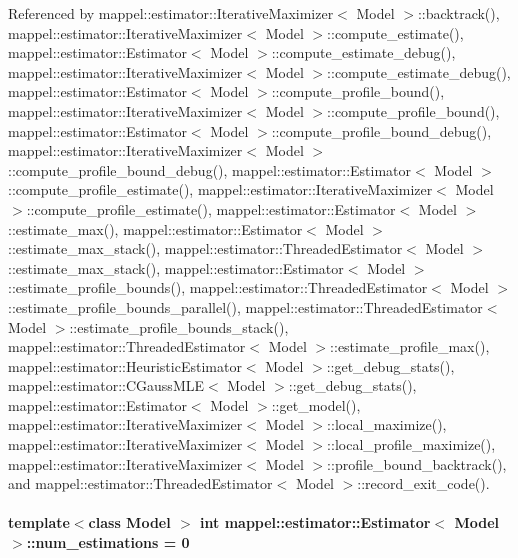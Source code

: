 Referenced by mappel\+::estimator\+::\+Iterative\+Maximizer$<$ Model $>$\+::backtrack(), mappel\+::estimator\+::\+Iterative\+Maximizer$<$ Model $>$\+::compute\+\_\+estimate(), mappel\+::estimator\+::\+Estimator$<$ Model $>$\+::compute\+\_\+estimate\+\_\+debug(), mappel\+::estimator\+::\+Iterative\+Maximizer$<$ Model $>$\+::compute\+\_\+estimate\+\_\+debug(), mappel\+::estimator\+::\+Estimator$<$ Model $>$\+::compute\+\_\+profile\+\_\+bound(), mappel\+::estimator\+::\+Iterative\+Maximizer$<$ Model $>$\+::compute\+\_\+profile\+\_\+bound(), mappel\+::estimator\+::\+Estimator$<$ Model $>$\+::compute\+\_\+profile\+\_\+bound\+\_\+debug(), mappel\+::estimator\+::\+Iterative\+Maximizer$<$ Model $>$\+::compute\+\_\+profile\+\_\+bound\+\_\+debug(), mappel\+::estimator\+::\+Estimator$<$ Model $>$\+::compute\+\_\+profile\+\_\+estimate(), mappel\+::estimator\+::\+Iterative\+Maximizer$<$ Model $>$\+::compute\+\_\+profile\+\_\+estimate(), mappel\+::estimator\+::\+Estimator$<$ Model $>$\+::estimate\+\_\+max(), mappel\+::estimator\+::\+Estimator$<$ Model $>$\+::estimate\+\_\+max\+\_\+stack(), mappel\+::estimator\+::\+Threaded\+Estimator$<$ Model $>$\+::estimate\+\_\+max\+\_\+stack(), mappel\+::estimator\+::\+Estimator$<$ Model $>$\+::estimate\+\_\+profile\+\_\+bounds(), mappel\+::estimator\+::\+Threaded\+Estimator$<$ Model $>$\+::estimate\+\_\+profile\+\_\+bounds\+\_\+parallel(), mappel\+::estimator\+::\+Threaded\+Estimator$<$ Model $>$\+::estimate\+\_\+profile\+\_\+bounds\+\_\+stack(), mappel\+::estimator\+::\+Threaded\+Estimator$<$ Model $>$\+::estimate\+\_\+profile\+\_\+max(), mappel\+::estimator\+::\+Heuristic\+Estimator$<$ Model $>$\+::get\+\_\+debug\+\_\+stats(), mappel\+::estimator\+::\+C\+Gauss\+M\+L\+E$<$ Model $>$\+::get\+\_\+debug\+\_\+stats(), mappel\+::estimator\+::\+Estimator$<$ Model $>$\+::get\+\_\+model(), mappel\+::estimator\+::\+Iterative\+Maximizer$<$ Model $>$\+::local\+\_\+maximize(), mappel\+::estimator\+::\+Iterative\+Maximizer$<$ Model $>$\+::local\+\_\+profile\+\_\+maximize(), mappel\+::estimator\+::\+Iterative\+Maximizer$<$ Model $>$\+::profile\+\_\+bound\+\_\+backtrack(), and mappel\+::estimator\+::\+Threaded\+Estimator$<$ Model $>$\+::record\+\_\+exit\+\_\+code().

\paragraph[{\texorpdfstring{num\+\_\+estimations}{num_estimations}}]{\setlength{\rightskip}{0pt plus 5cm}template$<$class Model $>$ int {\bf mappel\+::estimator\+::\+Estimator}$<$ Model $>$\+::num\+\_\+estimations = 0\hspace{0.3cm}{\ttfamily [protected]}}\hypertarget{classmappel_1_1estimator_1_1Estimator_a9f5390f0ac3ee127ddcd90dc6f4fd889}{}\label{classmappel_1_1estimator_1_1Estimator_a9f5390f0ac3ee127ddcd90dc6f4fd889}


